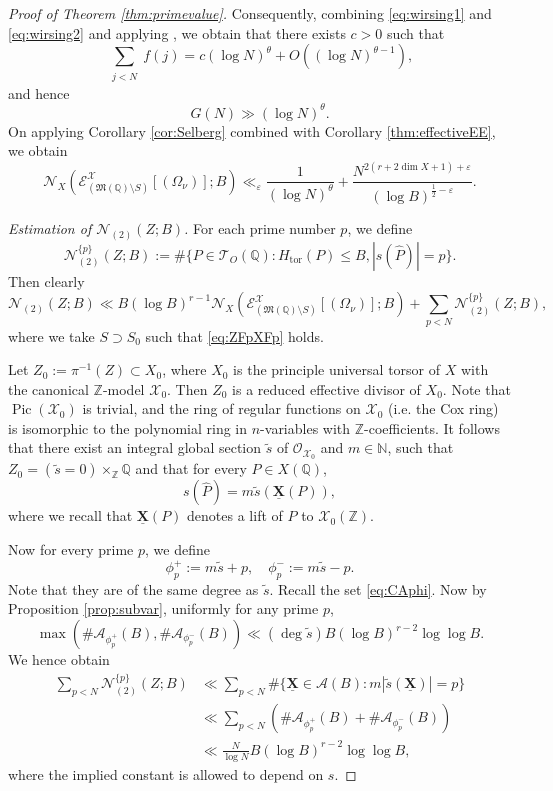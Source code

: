 \documentclass[11pt,letterpaper]{amsart}
\newcommand{\BN}{{\mathbb {N}}}
\newcommand{\BQ}{{\mathbb {Q}}}
\newcommand{\BZ}{{\mathbb {Z}}}
\newcommand{\CA}{{\mathcal {A}}}
\newcommand{\CE}{{\mathcal {E}}}
\newcommand{\CN}{{\mathcal {N}}}
\newcommand{\CO}{{\mathcal {O}}}
\newcommand{\CT}{{\mathcal {T}}}
\newcommand{\CX}{{\mathcal {X}}}
\newcommand{\Pic}{\operatorname{Pic}}
\newcommand{\XX}{\underline{\mathbf{X}}}
\theoremstyle{plain}
\numberwithin{equation}{section}
\theoremstyle{definition}
\theoremstyle{remark}
\begin{document}
\begin{proof}[Proof of Theorem \ref{thm:primevalue}]
Consequently, combining \eqref{eq:wirsing1} and \eqref{eq:wirsing2} and applying \cite[Theorem 1.1]{I-K}, we obtain that there exists $c>0$ such that
$$\sum_{\substack{j<N}}f(j)= c(\log N)^{\theta}+O\left((\log N)^{\theta-1}\right),$$ and hence $$G(N)\gg (\log N)^{\theta}.$$
On applying Corollary \ref{cor:Selberg} combined with Corollary \ref{thm:effectiveEE}, we obtain
\begin{equation}\label{eq:step1}
	\CN_X(\CE^{\CX}_{(\mathfrak{M}(\BQ)\setminus S)}[(\Omega_\nu)];B)\ll_\varepsilon \frac{1}{(\log N)^{\theta}}+\frac{N^{2(r+2\dim X+1)+\varepsilon}}{(\log B)^{\frac{1}{2}-\varepsilon}}.
\end{equation}

\emph{Estimation of $\CN_{(2)}(Z;B)$.} 
For each prime number $p$, we define
$$\CN_{(2)}^{\{p\}}(Z;B):=\#\{P\in\CT_{O}(\BQ):H_{\operatorname{tor}}(P)\leqslant B,|s(\widehat{P})|=p\}.$$ Then clearly 
\begin{equation}\label{eq:splitpN2}
	\CN_{(2)}(Z;B)\ll B(\log B)^{r-1}\CN_X(\CE^{\CX}_{(\mathfrak{M}(\BQ)\setminus S)}[(\Omega_\nu)];B)+\sum_{p<N}\CN_{(2)}^{\{p\}}(Z;B),
\end{equation} where we take $S\supset S_0$ such that \eqref{eq:ZFpXFp} holds.

Let $Z_0:=\pi^{-1}(Z)\subset X_0$, where $X_0$ is the principle universal torsor of $X$ with the canonical $\BZ$-model $\CX_0$. Then $Z_0$ is a reduced effective divisor of $X_0$. 
Note that $\Pic(\CX_0)$ is trivial, and the ring of regular functions on $\CX_0$ (i.e. the Cox ring) is isomorphic to the polynomial ring in $n$-variables with $\BZ$-coefficients. It follows that there exist an integral global section $\widetilde{s}$ of $\CO_{\CX_0}$ and $m\in\BN$, such that $Z_0=(\widetilde{s}=0)\times_{\BZ}\BQ$ and that for every $P\in X(\BQ)$, $$s(\widehat{P})=m\widetilde{s}(\XX(P)),$$ where we recall that $\XX(P)$ denotes a lift of $P$ to $\CX_0(\BZ)$. 

Now for every prime $p$, we define $$\phi_{p}^+:=m\widetilde{s}+p,\quad \phi_{p}^-:=m\widetilde{s}-p.$$ Note that they are of the same degree as $\widetilde{s}$.  Recall the set \eqref{eq:CAphi}.
Now by Proposition \ref{prop:subvar}, uniformly for any prime $p$, $$\max\left(\#\CA_{\phi_{p}^+}(B),\#\CA_{\phi_{p}^-}(B)\right)\ll (\deg \widetilde{s})B(\log B)^{r-2}\log\log B.$$
We hence obtain 
\begin{equation}\label{eq:step2}
	\begin{split}
		\sum_{p<N}\CN_{(2)}^{\{p\}}(Z;B)&\ll \sum_{p<N}\#\{\XX\in\CA(B):m|\widetilde{s}(\XX)|=p\}\\ &\ll\sum_{p<N}\left( \#\CA_{\phi_{p}^+}(B)+\#\CA_{\phi_{p}^-}(B)\right)\\ &\ll \frac{N}{\log N}B(\log B)^{r-2}\log\log B,
	\end{split}
\end{equation}
where the implied constant is allowed to depend on $s$. 


\end{proof}
\end{document}
